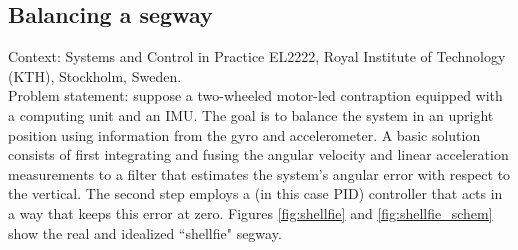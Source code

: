 \subsection{Balancing a segway}

Context: Systems and Control in Practice EL2222, Royal Institute of
Technology (KTH), Stockholm, Sweden.\\

Problem statement: suppose a two-wheeled motor-led contraption equipped with a
computing unit and an IMU. The goal is to balance the system in an upright
position using information from the gyro and accelerometer. A basic solution
consists of first integrating and fusing the angular velocity and linear
acceleration measurements to a filter that estimates the system's angular error
with respect to the vertical. The second step employs a (in this case PID)
controller that acts in a way that keeps this error at zero. Figures
\ref{fig:shellfie} and \ref{fig:shellfie_schem} show the real and idealized
``shellfie" segway.


